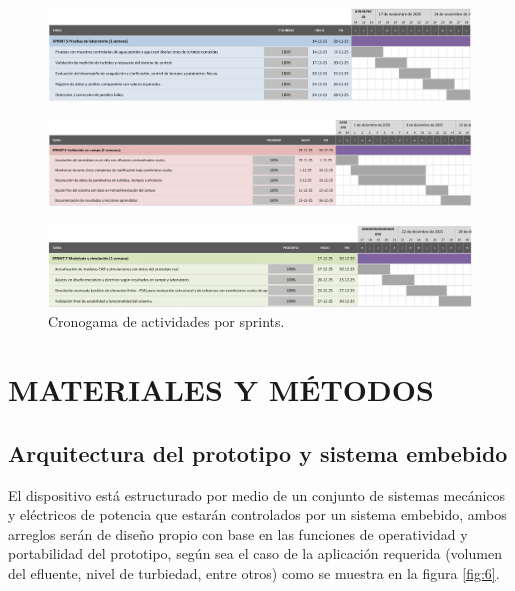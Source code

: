 \documentclass[conference]{IEEEtran}
\begin{document}
	\begin{figure}[!htbp]
	\centering
	\includegraphics[width=\columnwidth]{fig5_5.jpg}
	\end{figure}

	\begin{figure}[!htbp]
	\centering
	\includegraphics[width=\columnwidth]{fig5_6.jpg}
	\end{figure}

	\begin{figure}[!htbp]
	\centering
	\includegraphics[width=\columnwidth]{fig5_7.jpg}
	\caption{Cronogama de actividades por sprints.}
	\end{figure}

	\section{MATERIALES Y MÉTODOS}
	
	\subsection{Arquitectura del prototipo y sistema embebido}
	
	El dispositivo está estructurado por medio de un conjunto de sistemas mecánicos y eléctricos de potencia que estarán controlados por un sistema embebido, ambos arreglos serán de diseño propio con base en las funciones de operatividad y portabilidad del prototipo, según sea el caso de la aplicación requerida (volumen del efluente, nivel de turbiedad, entre otros) como se muestra en la figura \ref{fig:6}.
	
\end{document}
